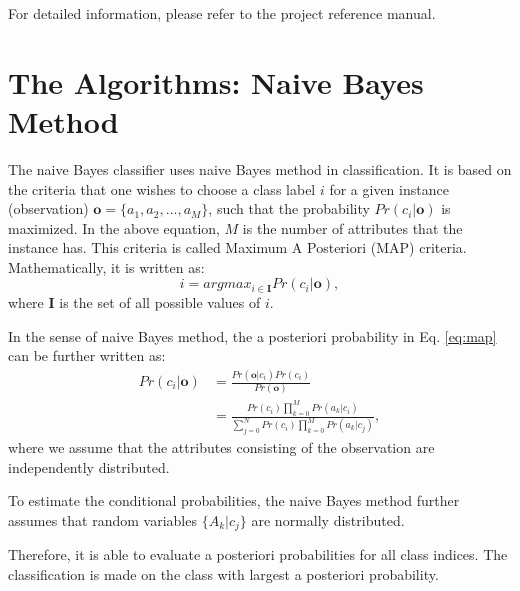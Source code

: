 \documentclass[a4paper,12pt]{article}
\begin{document}
For detailed information, please refer to the project reference manual.

\section{The Algorithms: Naive Bayes Method}
\label{sec:alg}
The naive Bayes classifier uses naive Bayes method in classification. It is based on the criteria that one wishes to choose a class label $i$ for a given instance (observation) $\mathbf{o}=\{a_1,a_2,\ldots,a_M\}$, such that the probability $Pr(c_i|\mathbf{o})$ is maximized. In the above equation, $M$ is the number of attributes that the instance has. This criteria is called Maximum A Posteriori (MAP) criteria. Mathematically, it is written as:
\begin{equation}
    \label{eq:map}
    i = argmax_{i \in \mathbf{I}} {Pr(c_i|\mathbf{o})},
\end{equation}
where $\mathbf{I}$ is the set of all possible values of $i$.

In the sense of naive Bayes method, the a posteriori probability in Eq. \ref{eq:map} can be further written as:
\begin{align}
    Pr(c_i|\mathbf{o}) & = \frac{Pr(\mathbf{o}|c_i)Pr(c_i)}{Pr(\mathbf{o})} \\
    & = \frac{ Pr(c_i) \prod_{k=0}^{M} { Pr(a_k|c_i) } } { \sum_{j=0}^{N} {Pr(c_i) \prod_{k=0}^{M}{Pr(a_k|c_j)} }},
\end{align}
where we assume that the attributes consisting of the observation are independently distributed.

To estimate the conditional probabilities, the naive Bayes method further assumes that random variables $\{A_k|c_j\}$ are normally distributed.

Therefore, it is able to evaluate a posteriori probabilities for all class indices. The classification is made on the class with largest a posteriori probability.

\end{document}
